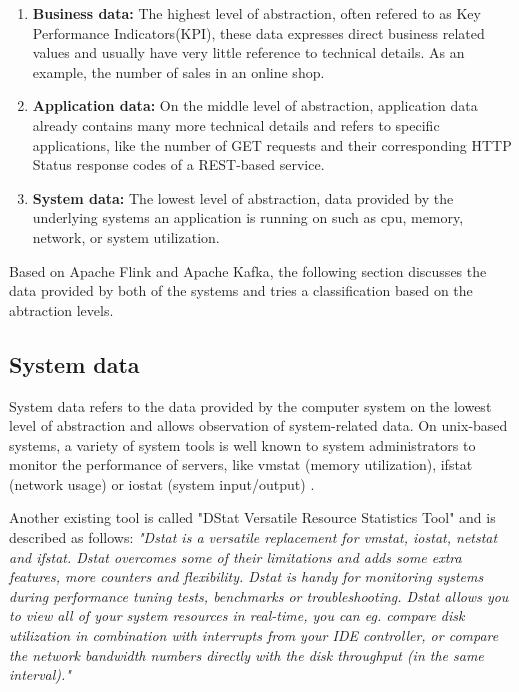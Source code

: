 \begin{enumerate}
    \item \textbf{Business data:} The highest level of abstraction, often refered to as Key Performance
    Indicators(KPI), these data expresses direct business related values and
    usually have very little reference to technical details. As an example, the number of
    sales in an online shop.
    \item \textbf{Application data:} On the middle level of abstraction, application data already
    contains many more technical details and refers to specific applications, like the
    number of GET requests and their corresponding HTTP Status response codes of a
    REST-based service.
    \item \textbf{System data:} The lowest level of abstraction, data provided by the underlying
    systems an application is running on such as cpu, memory, network, or system utilization.
\end{enumerate}

Based on Apache Flink and Apache Kafka, the following section discusses the data provided
by both of the systems and tries a classification based on the abtraction levels.

\subsection{System data}

System data refers to the data provided by the computer system on the lowest level of
abstraction and allows observation of system-related data. On unix-based systems, a
variety of system tools is well known to system administrators to monitor the performance
of servers, like vmstat (memory utilization), ifstat (network usage) or iostat (system
input/output) \cite{Hoeb12}.

Another existing tool is called "DStat Versatile Resource Statistics Tool" and is described
as follows: \textit{"Dstat is a versatile replacement for vmstat, iostat, netstat and ifstat. Dstat
overcomes some of their limitations and adds some extra features, more counters and flexibility.
Dstat is handy for monitoring systems during performance tuning tests, benchmarks
or troubleshooting. Dstat allows you to view all of your system resources in real-time, you
can eg. compare disk utilization in combination with interrupts from your IDE controller,
or compare the network bandwidth numbers directly with the disk throughput (in the same
interval)."}\cite{Wieers16}

